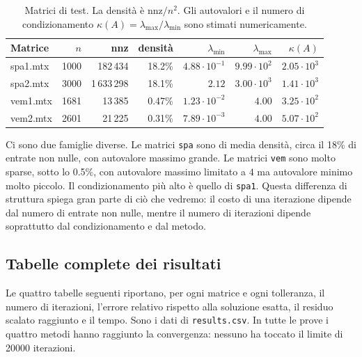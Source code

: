 \documentclass[11pt,a4paper]{article}
\begin{document}
\begin{table}[H]
\centering
\caption{Matrici di test. La densità è $\text{nnz}/n^2$. Gli autovalori e il
numero di condizionamento $\kappa(A)=\lambda_{\max}/\lambda_{\min}$ sono stimati
numericamente.}
\label{tab:matrici}
\begin{tabular}{lrrrrrr}
\toprule
Matrice & $n$ & nnz & densità & $\lambda_{\min}$ & $\lambda_{\max}$ & $\kappa(A)$ \\
\midrule
spa1.mtx & 1000 & 182\,434 & 18.2\% & $4.88\cdot10^{-1}$ & $9.99\cdot10^{2}$ & $2.05\cdot10^{3}$ \\
spa2.mtx & 3000 & 1\,633\,298 & 18.1\% & $2.12$ & $3.00\cdot10^{3}$ & $1.41\cdot10^{3}$ \\
vem1.mtx & 1681 & 13\,385 & 0.47\% & $1.23\cdot10^{-2}$ & $4.00$ & $3.25\cdot10^{2}$ \\
vem2.mtx & 2601 & 21\,225 & 0.31\% & $7.89\cdot10^{-3}$ & $4.00$ & $5.07\cdot10^{2}$ \\
\bottomrule
\end{tabular}
\end{table}

\noindent Ci sono due famiglie diverse. Le matrici
\texttt{spa} sono di media densità, circa il 18\% di entrate non nulle, con
autovalore massimo grande. Le matrici \texttt{vem} sono molto sparse, sotto lo
0.5\%, con autovalore massimo limitato a $4$ ma autovalore minimo molto piccolo.
Il condizionamento più alto è quello di \texttt{spa1}. Questa differenza di
struttura spiega gran parte di ciò che vedremo: il costo di una iterazione
dipende dal numero di entrate non nulle, mentre il numero di iterazioni dipende
soprattutto dal condizionamento e dal metodo.

\subsection{Tabelle complete dei risultati}
Le quattro tabelle seguenti riportano, per ogni matrice e ogni
tolleranza, il numero di iterazioni, l'errore relativo rispetto alla soluzione
esatta, il residuo scalato raggiunto e il tempo. Sono i dati di
\texttt{results.csv}. In tutte le prove i quattro metodi hanno raggiunto la
convergenza: nessuno ha toccato il limite di 20000 iterazioni.

\newcommand{\restab}[2]{%
\begin{table}[H]
\centering
\caption{#2}
\label{tab:#1}
\small
\begin{tabular}{llrrrr}
\toprule
Metodo & \texttt{tol} & Iter. & Errore rel. & Residuo rel. & Tempo [s] \\
\midrule
}
\newcommand{\restabend}{\bottomrule\end{tabular}\end{table}}
\end{document}
